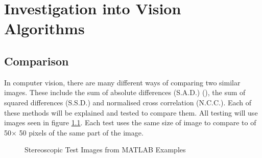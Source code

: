 \chapter{Investigation into Vision Algorithms} \label{Chapter:InvestigationVision}

\section{Comparison}
In computer vision, there are many different ways of comparing two similar images. These include the sum of absolute differences (S.A.D.) (\cite{Hamzah:DistanceDetection}), the sum of squared differences (S.S.D.) and  normalised cross correlation (N.C.C.). Each of these methods will be explained and tested to compare them. All testing will use images seen in figure \ref{fig:StereoTest}. Each test uses the same size of image to compare to of 50$\times$ 50 pixels of the same part of the image. 

\begin{figure}
\centering
{}
\caption{Stereoscopic Test Images from MATLAB Examples}
\label{fig:StereoTest}
\end{figure}


